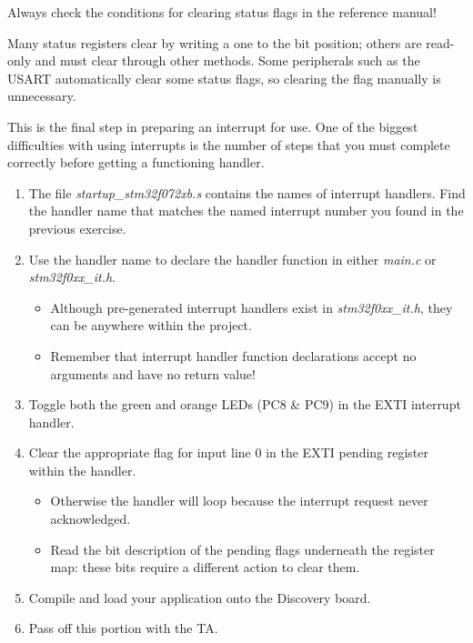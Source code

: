 \documentclass[11pt,fleqn]{book} %
\begin{document}
\begin{warning}
    Always check the conditions for clearing status flags in the reference manual!
    
    Many status registers clear by writing a one to the bit position; others are read-only and must clear through other methods. Some peripherals such as the USART automatically clear some status flags, so clearing the flag manually is unnecessary.
\end{warning}

\begin{assignment}
    \label{ex5}
    This is the final step in preparing an interrupt for use. One of the biggest difficulties with using interrupts is the number of steps that you must complete correctly before getting a functioning handler.
    
    \begin{enumerate}
        \item The file \textit{startup\_stm32f072xb.s} contains the names of interrupt handlers. Find the handler name that matches the named interrupt number you found in the previous exercise. 
        \item Use the handler name to declare the handler function in either \textit{main.c} or \textit{stm32f0xx\_it.h}.
        \begin{itemize}
            \item Although pre-generated interrupt handlers exist in \textit{stm32f0xx\_it.h}, they can be anywhere within the project. 
            \item Remember that interrupt handler function declarations accept no arguments and have no return value! 
        \end{itemize}
        \item Toggle both the green and orange LEDs (PC8 \& PC9) in the EXTI interrupt handler. 
        \item Clear the appropriate flag for input line 0 in the EXTI pending register within the handler.
        \begin{itemize}
            \item Otherwise the handler will loop because the interrupt request never acknowledged.
            \item Read the bit description of the pending flags underneath the register map: these bits require a different action to clear them.
        \end{itemize}
        \item Compile and load your application onto the Discovery board.
        \item Pass off this portion with the TA.
    \end{enumerate}
    

\end{assignment}
\end{document}
